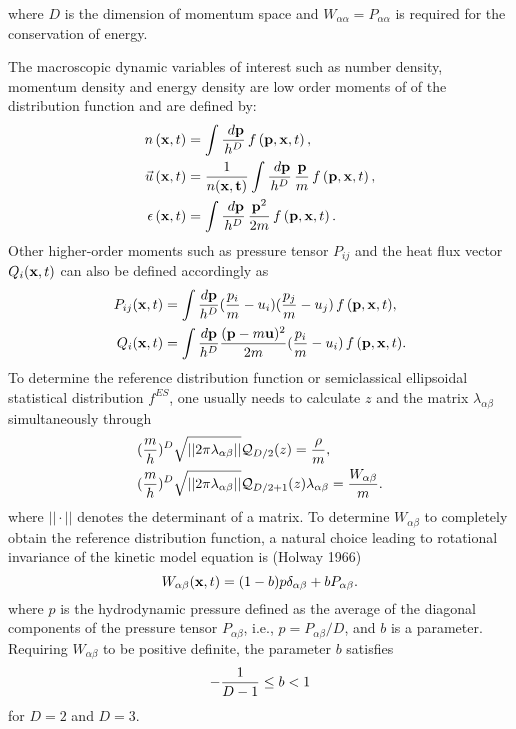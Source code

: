 \documentclass{rsproca}%
\begin{document}
where $D$ is the dimension of momentum space and $W_{\alpha \alpha} = P_{\alpha \alpha}$ is required for the conservation of energy.

The macroscopic dynamic variables of interest such as number density, momentum density and energy density are low order moments of of the distribution function and are defined by:
\begin{subequations}
\begin{align}
n\left({\bf x},t\right) &= \int{\frac{\ d{\bf p}}{h^D}}\,f\left({\bf p},{\bf x}, t\right), \\
\vec u \left({\bf x},t\right) &= {1\over n(\bf x, t) }\int{\frac{\ d{\bf p}}{h^D}\,\frac{\bf p}{m}}\,f\left({\bf p},{\bf x}, t\right), \\
{\epsilon}\left({\bf x},t\right) &= \int{\frac{\ d{\bf p}}{h^D}\,\frac{{\bf p}^2}{2m}}\,f\left({\bf p},{\bf x}, t\right).
\end{align}
\end{subequations}
Other higher-order moments such as pressure tensor $P_{ij}$ and the heat flux vector $Q_i({\bf x},t)$ can also be defined accordingly as
\begin{align}
P_{ij}({\bf x},t) &= \int{\frac{d{\bf p}}{h^D}(\frac{p_i}{m}-u_i)(\frac{p_j}{m}-u_j)\,f\,({\bf p},{\bf x},t)}, \\
Q_i({\bf x},t) &= \int{\frac{d{\bf p}}{h^D}\frac{({\bf p}-m{\bf u})^2}{2m}(\frac{p_i}{m}-u_i)\,f\,({\bf p},{\bf x},t)}.
\label{stressflux}
\end{align}
To determine the reference distribution function or semiclassical ellipsoidal statistical distribution $f^{ES}$, one usually needs to calculate $z$ and the matrix $\lambda_{\alpha \beta}$ simultaneously through
\begin{align}
&({m \over  h})^D \sqrt{ ||2 \pi \lambda_{\alpha \beta}|| } \mathcal{Q}_{D/2}(z)= {\rho \over m}, \\
&({m \over  h})^D \sqrt{ ||2 \pi \lambda_{\alpha \beta}|| } \mathcal{Q}_{D/2 +1}(z) \lambda_{\alpha \beta} = {W_{\alpha \beta} \over m} .
\end{align}
where $||\cdot ||$ denotes the determinant of a matrix.   To determine $W_{\alpha \beta}$ to completely obtain the reference distribution function, a natural choice leading to rotational invariance of the kinetic model equation is (Holway 1966)
\begin{equation}
W_{\alpha \beta}({\bf x},t) = (1 - b) p \delta_{\alpha \beta} + b P_{\alpha \beta}.
\end{equation}
where $p$ is the hydrodynamic pressure defined as the average of the diagonal components of the pressure tensor $P_{\alpha \beta}$, i.e., $p = P_{\alpha \beta}/D$, and $b$ is a parameter.  Requiring $ W_{\alpha \beta}$ to be positive definite, the parameter $b$ satisfies
\begin{align}
-{ 1\over D-1} \le b < 1
\end{align}
for $D=2$ and $D=3$.
\end{document}
